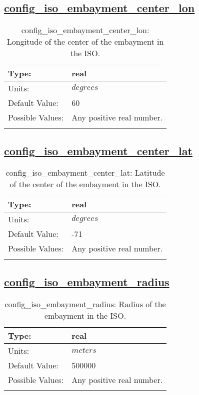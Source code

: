 \subsection[config\_iso\_embayment\_center\_lon]{\hyperref[sec:nm_tab_iso]{config\_iso\_embayment\_center\_lon}}
\label{subsec:nm_sec_config_iso_embayment_center_lon}
\begin{center}
\begin{longtable}{| p{2.0in} || p{4.0in} |}
    \hline
    Type: & real \\
    \hline
    Units: & $degrees$ \\
    \hline
    Default Value: & 60 \\
    \hline
    Possible Values: & Any positive real number. \\
    \hline
    \caption{config\_iso\_embayment\_center\_lon: Longitude of the center of the embayment in the ISO.}
\end{longtable}
\end{center}
\subsection[config\_iso\_embayment\_center\_lat]{\hyperref[sec:nm_tab_iso]{config\_iso\_embayment\_center\_lat}}
\label{subsec:nm_sec_config_iso_embayment_center_lat}
\begin{center}
\begin{longtable}{| p{2.0in} || p{4.0in} |}
    \hline
    Type: & real \\
    \hline
    Units: & $degrees$ \\
    \hline
    Default Value: & -71 \\
    \hline
    Possible Values: & Any positive real number. \\
    \hline
    \caption{config\_iso\_embayment\_center\_lat: Latitude of the center of the embayment in the ISO.}
\end{longtable}
\end{center}
\subsection[config\_iso\_embayment\_radius]{\hyperref[sec:nm_tab_iso]{config\_iso\_embayment\_radius}}
\label{subsec:nm_sec_config_iso_embayment_radius}
\begin{center}
\begin{longtable}{| p{2.0in} || p{4.0in} |}
    \hline
    Type: & real \\
    \hline
    Units: & $meters$ \\
    \hline
    Default Value: & 500000 \\
    \hline
    Possible Values: & Any positive real number. \\
    \hline
    \caption{config\_iso\_embayment\_radius: Radius of the embayment in the ISO.}
\end{longtable}
\end{center}
